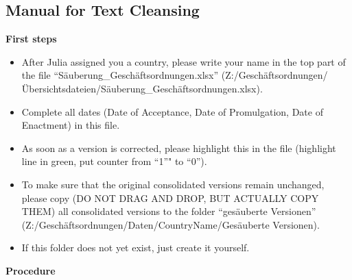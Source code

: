 \documentclass[10pt,]{article}
\providecommand{\tightlist}{%
  \setlength{\itemsep}{0pt}\setlength{\parskip}{0pt}}
\begin{document}
\subsection{Manual for Text Cleansing}\label{manual-for-text-cleansing}

\textbf{First steps}

\begin{itemize}
\tightlist
\item
  After Julia assigned you a country, please write your name in the top
  part of the file ``Säuberung\_Geschäftsordnungen.xlsx''
  (Z:/Geschäftsordnungen/Übersichtsdateien/Säuberung\_Geschäftsordnungen.xlsx).
\item
  Complete all dates (Date of Acceptance, Date of Promulgation, Date of
  Enactment) in this file.
\item
  As soon as a version is corrected, please highlight this in the file
  (highlight line in green, put counter from ``1''" to ``0'').
\item
  To make sure that the original consolidated versions remain unchanged,
  please copy (DO NOT DRAG AND DROP, BUT ACTUALLY COPY THEM) all
  consolidated versions to the folder ``gesäuberte Versionen''
  (Z:/Geschäftsordnungen/Daten/CountryName/Gesäuberte Versionen).
\item
  If this folder does not yet exist, just create it yourself.
\end{itemize}

\textbf{Procedure}
\end{document}
